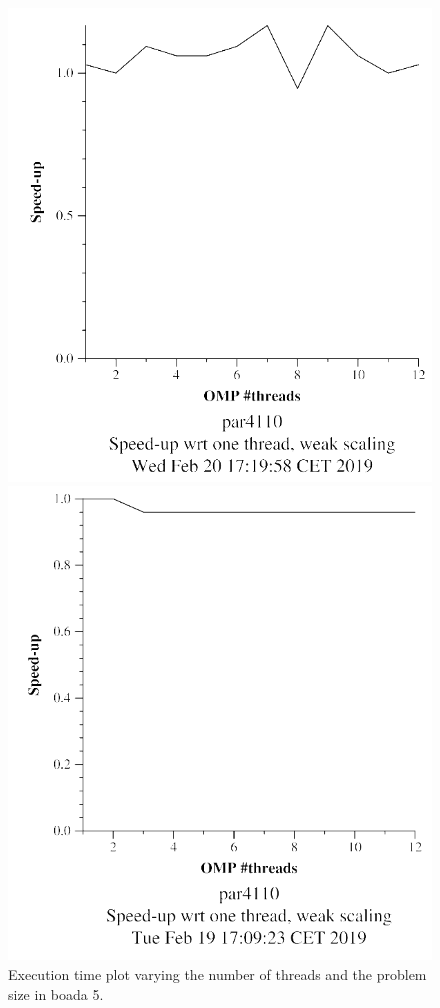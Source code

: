 \documentclass[12pt, a4paper]{article}
\begin{document}
\begin{figure}[ht]
\begin{minipage}[b]{0.30\linewidth}
\includegraphics[width=\textwidth]{./images/weak_v5}

\caption{Execution time plot varying the number of threads and the problem size in boada 5.}
\label{fig:weak_v5}
\end{minipage}
\hspace{0.5cm}
\begin{minipage}[b]{0.30\linewidth}
\centering
\includegraphics[width=\textwidth]{./images/weak_v8}


\end{minipage}
\end{figure}
\end{document}
